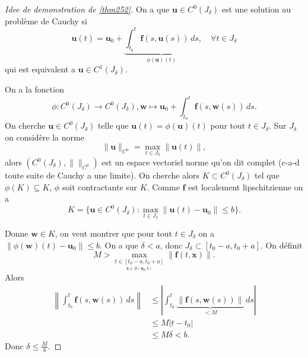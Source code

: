 \begin{proof}[Idee de demonstration de \ref{thm252}]
On a que $\boldsymbol{u}\in C^{0}(J_{\delta})$ est une solution au problème de Cauchy si
$$
\boldsymbol{u}(t)=\boldsymbol{u}_{0}+\underbrace{ \int_{t_{0}}^{t} \boldsymbol{f}(s,\boldsymbol{u}(s)) \, ds  }_{ \phi(\boldsymbol{u})(t) },\quad \forall t \in J_{\delta}
$$
qui est equivalent a $\boldsymbol{u}\in C^{1}(J_{\delta})$.

On a la fonction $$\phi:C^{0}(J_{\delta})\to C^{0}(J_{\delta}), \boldsymbol{w}\mapsto \boldsymbol{u}_{0}+\int_{t_{0}}^{t} \boldsymbol{f}(s,\boldsymbol{w}(s)) \, ds.$$
On cherche $\boldsymbol{u}\in C^{0}(J_{\delta})$ telle que $\boldsymbol{u}(t)=\phi(\boldsymbol{u})(t)$ pour tout $t\in J_{\delta}$. Sur $J_{\delta}$ on considère la norme
$$
\lVert \boldsymbol{u} \rVert _{C^{0}}=\max_{t\in J_{\delta}}\lVert \boldsymbol{u}(t) \rVert, 
$$
alors $(C^{0}(J_{\delta}),\lVert  \rVert_{C^{0}})$ est un espace vectoriel norme qu'on dit complet (c-a-d toute suite de Cauchy a une limite). On cherche alors $K\subset C^{0}(J_{\delta})$ tel que $\phi(K)\subseteq K$, $\phi$ soit contractante sur $K$. Comme $\boldsymbol{f}$ est localement lipschitzienne on a 
$$
K=\{ \boldsymbol{u}\in C^{0}(J_{\delta}):\max_{t\in J_{\delta}}\lVert \boldsymbol{u}(t)-\boldsymbol{u}_{0} \rVert \le b \}.
$$

Donne $\boldsymbol{w}\in K$, on veut montrer que pour tout $t\in J_{\delta}$ on a $\lVert \phi(\boldsymbol{w})(t)-\boldsymbol{u}_{0} \rVert\le b$. On a que $\delta<a$, donc $J_{\delta}\subset[t_{0}-a,t_{0}+a]$. On définit
$$
M> \max_{\underset{\boldsymbol{x}\in \overline{B}(\boldsymbol{u}_{0},b)}{t\in[t_{0}-a,t_{0}+a]}}\lVert \boldsymbol{f}(t,\boldsymbol{x}) \rVert .
$$
Alors
\begin{align*}
\left\lVert  \int_{t_{0}}^{t} \boldsymbol{f}(s,\boldsymbol{w}(s)) \, ds   \right\rVert  & \le \left\lvert  \int_{t_{0}}^{t} \underbrace{ \lVert \boldsymbol{f}(s,\boldsymbol{w}(s)) \rVert }_{ <M }  \, ds   \right\rvert \\
 & \le M|t-t_{0}|  \\
 & \le M\delta<b. 
\end{align*}
Donc $\delta\le \frac{M}{b}$.


\end{proof}
